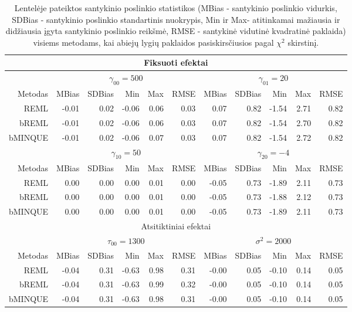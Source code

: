 \documentclass[12pt,a4paper]{article}
\begin{document}
\begin{small}
\begin{table}[H]
\label{table:y2}
\centering
\begin{tabular}{r|rrrrr|rrrrr|}
\hline
\multicolumn{11}{c}{Fiksuoti efektai}\\
\hline
& \multicolumn{5}{c|}{$\gamma_{00} = 500$}&\multicolumn{5}{c|}{$\gamma_{01} = 20$}\\
\hline
Metodas & MBias & SDBias & Min & Max & RMSE & MBias & SDBias & Min & Max & RMSE\\
\hline
REML & -0.01 & 0.02 & -0.06 & 0.06 & 0.03 & 0.07 & 0.82 & -1.54 & 2.71 & 0.82 \\
bREML& -0.01 & 0.02 & -0.06 & 0.06 & 0.03& 0.07 & 0.82 & -1.54 & 2.70 & 0.82 \\
bMINQUE & -0.01 & 0.02 & -0.06 & 0.07 & 0.03& 0.07 & 0.82 & -1.54 & 2.72 & 0.82\\
\hline
& \multicolumn{5}{c|}{$\gamma_{10} = 50$}&\multicolumn{5}{c|}{$\gamma_{20} = -4$}\\
\hline
Metodas & MBias & SDBias & Min & Max & RMSE & MBias & SDBias & Min & Max & RMSE\\
\hline
REML & 0.00 & 0.00 & 0.00 & 0.01 & 0.00& -0.05 & 0.73 & -1.89 & 2.11 & 0.73\\
bREML & 0.00 & 0.00 & 0.00 & 0.01 & 0.00& -0.05 & 0.73 & -1.88 & 2.12 & 0.73\\
bMINQUE & 0.00 & 0.00 & 0.00 & 0.01 & 0.00& -0.05 & 0.73 & -1.89 & 2.11 & 0.73\\
\hline
\multicolumn{11}{c}{Atsitiktiniai efektai}\\
\hline
& \multicolumn{5}{c|}{$\tau_{00}=1300$}&\multicolumn{5}{c|}{$\sigma^2=2000$}\\
\hline
Metodas & MBias & SDBias & Min & Max & RMSE & MBias & SDBias & Min & Max & RMSE\\
\hline
REML &-0.04 & 0.31 & -0.63 & 0.98 & 0.31& -0.00 & 0.05 & -0.10 & 0.14 & 0.05\\
bREML & -0.04 & 0.31 & -0.63 & 0.99 & 0.32& -0.00 & 0.05 & -0.10 & 0.14 & 0.05\\
bMINQUE & -0.04 & 0.31 & -0.63 & 0.98 & 0.31& -0.00 & 0.05 & -0.10 & 0.14 & 0.05\\
\hline
\end{tabular}
\caption{Lentelėje pateiktos santykinio poslinkio statistikos (MBias - santykinio poslinkio vidurkis, SDBias - santykinio poslinkio standartinis nuokrypis, Min ir Max- atitinkamai mažiausia ir didžiausia įgyta santykinio poslinkio reikšmė, RMSE - santykinė vidutinė kvadratinė paklaida) visiems metodams, kai abiejų lygių paklaidos pasiskirsčiusios pagal $\chi^2$ skirstinį.}
\end{table}
\end{small}
\end{document}
